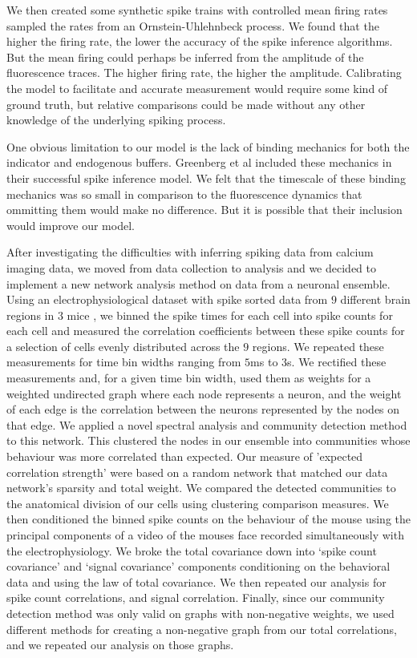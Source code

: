 We then created some synthetic spike trains with controlled mean firing rates sampled the rates from an Ornstein-Uhlehnbeck process. We found that the higher the firing rate, the lower the accuracy of the spike inference algorithms. But the mean firing could perhaps be inferred from the amplitude of the fluorescence traces. The higher firing rate, the higher the amplitude. Calibrating the model to facilitate and accurate measurement would require some kind of ground truth, but relative comparisons could be made without any other knowledge of the underlying spiking process.

One obvious limitation to our model is the lack of binding mechanics for both the indicator and endogenous buffers. Greenberg et al included these mechanics in their successful spike inference model. We felt that the timescale of these binding mechanics was so small in comparison to the fluorescence dynamics that ommitting them would make no difference. But it is possible that their inclusion would improve our model.

After investigating the difficulties with inferring spiking data from calcium imaging data, we moved from data collection to analysis and we decided to implement a new network analysis method on data from a neuronal ensemble. Using an electrophysiological dataset with spike sorted data from $9$ different brain regions in $3$ mice \parencite{steinmetz}, we binned the spike times for each cell into spike counts for each cell and measured the correlation coefficients between these spike counts for a selection of cells evenly distributed across the $9$ regions. We repeated these measurements for time bin widths ranging from $5$ms to $3$s. We rectified these measurements and, for a given time bin width, used them as weights for a weighted undirected graph where each node represents a neuron, and the weight of each edge is the correlation between the neurons represented by the nodes on that edge. We applied a novel spectral analysis and community detection method \parencite{humphries} to this network. This clustered the nodes in our ensemble into communities whose behaviour was more correlated than expected. Our measure of 'expected correlation strength' were based on a random network that matched our data network's sparsity and total weight. We compared the detected communities to the anatomical division of our cells using clustering comparison measures. We then conditioned the binned spike counts on the behaviour of the mouse using the principal components of a video of the mouses face recorded simultaneously with the electrophysiology. We broke the total covariance down into `spike count covariance' and `signal covariance' components  conditioning on the behavioral data and using the law of total covariance. We then repeated our analysis for spike count correlations, and signal correlation. Finally, since our community detection method was only valid on graphs with non-negative weights, we used different methods for creating a non-negative graph from our total correlations, and we repeated our analysis on those graphs.

